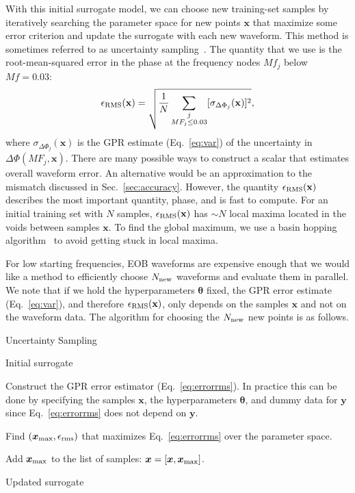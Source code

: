 \documentclass[prd,aps,letter,twocolumn,floatfix,notitlepage,nofootinbib]{revtex4-1}
\def\bx{\mathbf{x}}
\def\by{\mathbf{y}}
\def\btheta{\boldsymbol{\theta}}
\begin{document}
With this initial surrogate model, we can choose new training-set samples by iteratively searching the parameter space for new points ${\bm x}$ that maximize some error criterion and update the surrogate with each new waveform. This method is sometimes referred to as uncertainty sampling~\cite{BrochuCoraDeFreitas2010}. The quantity that we use is the root-mean-squared error in the phase at the frequency nodes $Mf_j$ below $Mf=0.03$:
\begin{equation}
\epsilon_{\rm RMS}(\bx) = \sqrt{\frac{1}{N} \sum_{ \substack{j \\ MF_j \le 0.03} } [\sigma_{\Delta\Phi_j}(\bx)]^2},
\label{eq:errorrms}
\end{equation}
where $\sigma_{\Delta\Phi_j}(\bx)$ is the GPR estimate (Eq.~\eqref{eq:var}) of the uncertainty in $\Delta\Phi(MF_j, \bx)$. There are many possible ways to construct a scalar that estimates overall waveform error. An alternative would be an approximation to the mismatch discussed in Sec.~\ref{sec:accuracy}. However, the quantity $\epsilon_{\rm RMS}(\bx)$ describes the most important quantity, phase, and is fast to compute. For an initial training set with $N$ samples, $\epsilon_{\rm RMS}(\bx)$ has $\sim N$ local maxima located in the voids between samples $\bx$. To find the global maximum, we use a basin hopping algorithm~\cite{WalesDoye1998, scipy:basinhopping} to avoid getting stuck in local maxima.

For low starting frequencies, EOB waveforms are expensive enough that we would like a method to efficiently choose $N_{\rm new}$ waveforms and evaluate them in parallel. We note that if we hold the hyperparameters $\btheta$ fixed, the GPR error estimate (Eq.~\eqref{eq:var}), and therefore $\epsilon_{\rm RMS}(\bx)$, only depends on the samples $\bx$ and not on the waveform data. The algorithm for choosing the $N_{\rm new}$ new points is as follows.


\begin{algorithm}[H]
\caption{Uncertainty Sampling}
\label{alg:uc}
\begin{algorithmic}[1]
 Initial surrogate 

\State Construct the GPR error estimator (Eq.~\eqref{eq:errorrms}). In practice this can be done by specifying the samples $\bx$, the hyperparameters $\btheta$, and dummy data for $\by$ since Eq.~\eqref{eq:errorrms} does not depend on $\by$.

\State Find $({\bm x}_{\rm max}, \epsilon_{\rm rms})$ that maximizes Eq.~\eqref{eq:errorrms} over the parameter space.

\State Add ${\bm x}_{\rm max}$ to the list of samples: ${\bm x} = [{\bm x}, {\bm x}_{\rm max}]$.

\EndFor
{} Updated surrogate
\end{algorithmic}
\end{algorithm}
\end{document}
